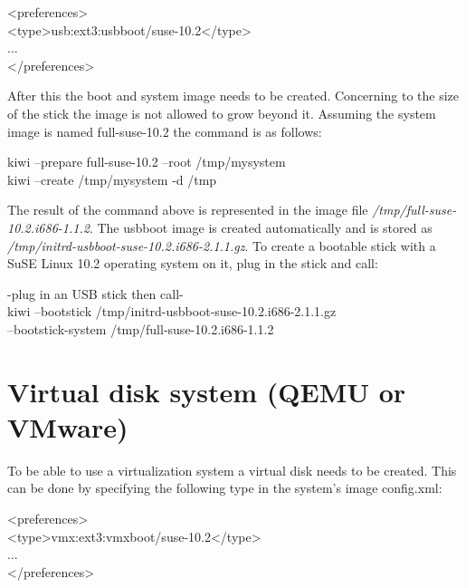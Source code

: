 \begin{Command}{14cm}
<preferences>\\
\hspace*{1cm}<type>usb:ext3:usbboot/suse-10.2</type>\\
\hspace*{1cm}...\\
</preferences>
\end{Command}

After this the boot and system image needs to be
created. Concerning to the size of the stick the image is not allowed to
grow beyond it. Assuming the system image is named full-suse-10.2
the command is as follows:

\begin{Command}{14cm}
	kiwi --prepare full-suse-10.2 --root /tmp/mysystem\\
	kiwi --create /tmp/mysystem -d /tmp
\end{Command}

The result of the command above is represented in the image file
\textit{/tmp/full-suse-10.2.i686-1.1.2}. The usbboot image is created
automatically and is stored as
\textit{/tmp/initrd-usbboot-suse-10.2.i686-2.1.1.gz}.
To create a bootable stick with a SuSE Linux 10.2 operating system on
it, plug in the stick and call:

\begin{Command}{14cm}
	-plug in an USB stick then call-\\
	kiwi --bootstick /tmp/initrd-usbboot-suse-10.2.i686-2.1.1.gz \bs\\
    \hspace*{1.1cm}--bootstick-system /tmp/full-suse-10.2.i686-1.1.2
\end{Command}

\section{Virtual disk system (QEMU or VMware)}
To be able to use a virtualization system a virtual disk needs to
be created. This can be done by specifying the following type in the
system's image config.xml:

\begin{Command}{14cm}
<preferences>\\
\hspace*{1cm}<type>vmx:ext3:vmxboot/suse-10.2</type>\\
\hspace*{1cm}...\\
</preferences>
\end{Command}

